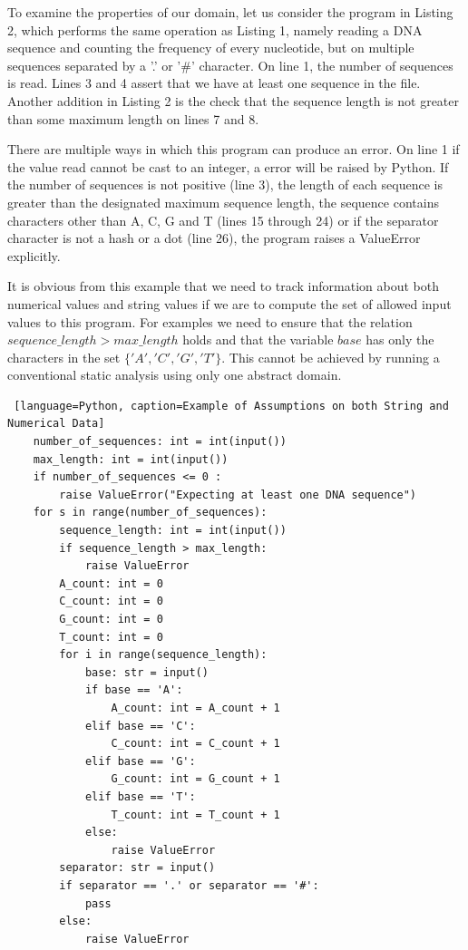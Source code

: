 \documentclass[10pt]{report}
\begin{document}
To examine the properties of our domain, let us consider the program in Listing 2, which performs the same operation as Listing 1, namely reading a DNA sequence and counting the frequency of every nucleotide, but on multiple sequences separated by a '.' or '\#' character. On line 1, the number of sequences is read. Lines 3 and 4 assert that we have at least one sequence in the file. Another addition in Listing 2 is the check that the sequence length is not greater than some maximum length on lines 7 and 8. 

There are multiple ways in which this program can produce an error. On line 1 if the value read cannot be cast to an integer, a error will be raised by Python. If the number of sequences is not positive (line 3), the length of each sequence is greater than the designated maximum sequence length, the sequence contains characters other than A, C, G and T (lines 15 through 24) or if the separator character is not a hash or a dot (line 26), the program raises a ValueError explicitly. 

It is obvious from this example that we need to track information about both numerical values and string values if we are to compute the set of allowed input values to this program. For examples we need to ensure that the relation $sequence\_length > max\_length$ holds and that the variable $base$ has only the characters in the set $\lbrace'A', 'C', 'G', 'T' \rbrace$. This cannot be achieved by running a conventional static analysis using only one abstract domain.

\begin{lstlisting} [language=Python, caption=Example of Assumptions on both String and Numerical Data]
	number_of_sequences: int = int(input())
	max_length: int = int(input())
	if number_of_sequences <= 0 :
		raise ValueError("Expecting at least one DNA sequence")
	for s in range(number_of_sequences):
		sequence_length: int = int(input())
		if sequence_length > max_length:
			raise ValueError
		A_count: int = 0
		C_count: int = 0
		G_count: int = 0
		T_count: int = 0
		for i in range(sequence_length):
			base: str = input()
			if base == 'A':
				A_count: int = A_count + 1
			elif base == 'C':
				C_count: int = C_count + 1
			elif base == 'G':
				G_count: int = G_count + 1
			elif base == 'T':
				T_count: int = T_count + 1
			else:
				raise ValueError
		separator: str = input()
		if separator == '.' or separator == '#':
			pass
		else:
			raise ValueError
\end{lstlisting}
\end{document}
